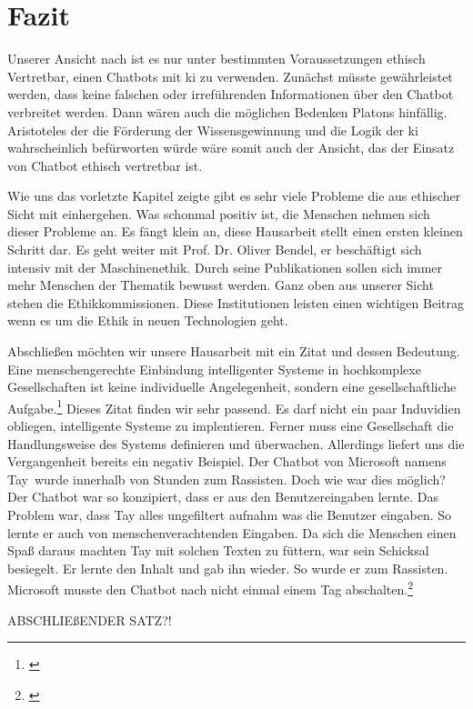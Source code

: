 \section{Fazit}
Unserer Ansicht nach ist es nur unter bestimmten Voraussetzungen ethisch Vertretbar, einen Chatbots mit \ac{ki} zu verwenden.
Zunächst müsste gewährleistet werden, dass keine falschen oder irreführenden Informationen über den Chatbot verbreitet werden. Dann wären auch die möglichen Bedenken Platons hinfällig. Aristoteles der die Förderung der Wissensgewinnung und die Logik der \ac{ki} wahrscheinlich befürworten würde wäre somit auch der Ansicht, das der Einsatz von Chatbot ethisch vertretbar ist.

   





Wie uns das vorletzte Kapitel zeigte gibt es sehr viele Probleme die aus ethischer Sicht mit einhergehen. Was schonmal positiv ist, die Menschen nehmen sich dieser Probleme an. Es fängt klein an, diese Hausarbeit stellt einen ersten kleinen Schritt dar. Es geht weiter mit Prof. Dr. Oliver Bendel, er beschäftigt sich intensiv mit der Maschinenethik. Durch seine Publikationen sollen sich immer mehr Menschen der Thematik bewusst werden. Ganz oben aus unserer Sicht stehen die Ethikkommissionen. Diese Institutionen leisten einen wichtigen Beitrag wenn es um die Ethik in neuen Technologien geht.

Abschließen möchten wir unsere Hausarbeit mit ein Zitat und dessen Bedeutung. 
\glqq Eine menschengerechte Einbindung intelligenter Systeme in hochkomplexe Gesellschaften ist keine individuelle Angelegenheit, sondern eine gesellschaftliche Aufgabe.\grqq\footnote{\cite{BitkomZitat}}
Dieses Zitat finden wir sehr passend. Es darf nicht ein paar Induvidien obliegen, intelligente Systeme zu implentieren. Ferner muss eine Gesellschaft die Handlungsweise des Systems definieren und überwachen. Allerdings liefert uns die Vergangenheit bereits ein negativ Beispiel. \newline
Der Chatbot von Microsoft namens \glqq Tay\grqq\ wurde innerhalb von Stunden zum Rassisten. Doch wie war dies möglich? Der Chatbot war so konzipiert, dass er aus den Benutzereingaben lernte. Das Problem war, dass Tay alles ungefiltert aufnahm was die Benutzer eingaben. So lernte er auch von menschenverachtenden Eingaben. Da sich die Menschen einen Spaß daraus machten Tay mit solchen Texten zu \glqq füttern\grqq, war sein Schicksal besiegelt. Er lernte den Inhalt und gab ihn wieder. So wurde er zum Rassisten. Microsoft musste den Chatbot nach nicht einmal einem Tag abschalten.\footnote{\cite{TaySpiegel}} 

ABSCHLIEßENDER SATZ?!


